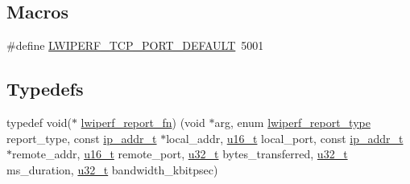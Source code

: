 \subsection*{Macros}
\begin{DoxyCompactItemize}
\item 
\#define \hyperlink{openmote-cc2538_2lwip_2src_2include_2lwip_2apps_2lwiperf_8h_a911cc7e298ab38433bd4a4980cdcad15}{L\+W\+I\+P\+E\+R\+F\+\_\+\+T\+C\+P\+\_\+\+P\+O\+R\+T\+\_\+\+D\+E\+F\+A\+U\+LT}~5001
\end{DoxyCompactItemize}
\subsection*{Typedefs}
\begin{DoxyCompactItemize}
\item 
typedef void($\ast$ \hyperlink{openmote-cc2538_2lwip_2src_2include_2lwip_2apps_2lwiperf_8h_a248ea47a58a14c6aecf6525217a812fd}{lwiperf\+\_\+report\+\_\+fn}) (void $\ast$arg, enum \hyperlink{native_2lwip_2src_2include_2lwip_2apps_2lwiperf_8h_ab72a2d205e43d5243a291f937bbc24d6}{lwiperf\+\_\+report\+\_\+type} report\+\_\+type, const \hyperlink{native_2lwip_2src_2include_2lwip_2ip__addr_8h_a88b43639738c4de2d3cd22e3a1fd7696}{ip\+\_\+addr\+\_\+t} $\ast$local\+\_\+addr, \hyperlink{group__compiler__abstraction_ga77570ac4fcab86864fa1916e55676da2}{u16\+\_\+t} local\+\_\+port, const \hyperlink{native_2lwip_2src_2include_2lwip_2ip__addr_8h_a88b43639738c4de2d3cd22e3a1fd7696}{ip\+\_\+addr\+\_\+t} $\ast$remote\+\_\+addr, \hyperlink{group__compiler__abstraction_ga77570ac4fcab86864fa1916e55676da2}{u16\+\_\+t} remote\+\_\+port, \hyperlink{group__compiler__abstraction_ga4c14294869aceba3ef9d4c0c302d0f33}{u32\+\_\+t} bytes\+\_\+transferred, \hyperlink{group__compiler__abstraction_ga4c14294869aceba3ef9d4c0c302d0f33}{u32\+\_\+t} ms\+\_\+duration, \hyperlink{group__compiler__abstraction_ga4c14294869aceba3ef9d4c0c302d0f33}{u32\+\_\+t} bandwidth\+\_\+kbitpsec)
\end{DoxyCompactItemize}

